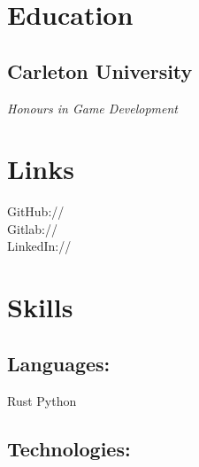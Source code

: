 \documentclass[]{deedy-resume-openfont}
\begin{document}
\vspace*{10pt}


%
%

\begin{minipage}[t]{0.33\textwidth}

\section{Education}

\subsection{Carleton University}
\textit{Honours in Game Development}
\sectionsep

\section{Links}

\sectionsep

GitHub:// \href{https://github.com/AngelOnFira}{}\\

Gitlab:// \href{https://gitlab.com/AngelOnFira}{}\\

LinkedIn://  \href{https://www.linkedin.com/in/forest-anderson}{}

\sectionsep

\section{Skills}

\subsection{Languages:}
\sectionsep

Rust \textbullet{} Python \\

\sectionsep
\subsection{Technologies:}
\sectionsep


\end{minipage}
\end{document}
